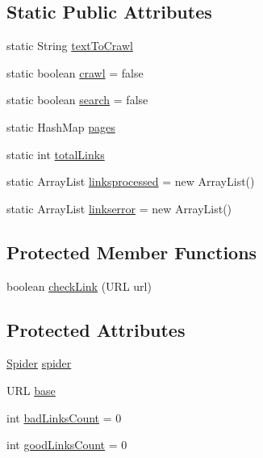 \subsection*{\-Static \-Public \-Attributes}
\begin{DoxyCompactItemize}
\item 
static \-String \hyperlink{classcom_1_1spider_1_1jspiderlibrary2_1_1_communicator_a77d1d4556b66f56aad5fe9e1afda94d6}{text\-To\-Crawl}
\item 
static boolean \hyperlink{classcom_1_1spider_1_1jspiderlibrary2_1_1_communicator_aa0fb097a1e3dd28c5b3595965d0ebcd7}{crawl} = false
\item 
static boolean \hyperlink{classcom_1_1spider_1_1jspiderlibrary2_1_1_communicator_af0e22c130c8e3180b699325c5258bd83}{search} = false
\item 
static \-Hash\-Map \hyperlink{classcom_1_1spider_1_1jspiderlibrary2_1_1_communicator_a0c07a2143b8d612dd3a37f0ea948c458}{pages}
\item 
static int \hyperlink{classcom_1_1spider_1_1jspiderlibrary2_1_1_communicator_af85276b4b0e742776669cd6af974480c}{total\-Links}
\item 
static \-Array\-List \hyperlink{classcom_1_1spider_1_1jspiderlibrary2_1_1_communicator_ae6f31dbdb619cb67252f0c549ea8d81d}{linksprocessed} = new \-Array\-List()
\item 
static \-Array\-List \hyperlink{classcom_1_1spider_1_1jspiderlibrary2_1_1_communicator_ad9dc6cc7afc6f0203c1b5c723cd3cb06}{linkserror} = new \-Array\-List()
\end{DoxyCompactItemize}
\subsection*{\-Protected \-Member \-Functions}
\begin{DoxyCompactItemize}
\item 
boolean \hyperlink{classcom_1_1spider_1_1jspiderlibrary2_1_1_communicator_aa952bce8373401854579773a53fee26a}{check\-Link} (\-U\-R\-L url)
\end{DoxyCompactItemize}
\subsection*{\-Protected \-Attributes}
\begin{DoxyCompactItemize}
\item 
\hyperlink{classcom_1_1spider_1_1jspiderlibrary2_1_1_spider}{\-Spider} \hyperlink{classcom_1_1spider_1_1jspiderlibrary2_1_1_communicator_ad0dd6511cd30b7ad8edfd359a21c6cc3}{spider}
\item 
\-U\-R\-L \hyperlink{classcom_1_1spider_1_1jspiderlibrary2_1_1_communicator_ad0101fe504108054c599ff671b035ae7}{base}
\item 
int \hyperlink{classcom_1_1spider_1_1jspiderlibrary2_1_1_communicator_af90a1a8ad937a05d9b6058e669d28ca1}{bad\-Links\-Count} = 0
\item 
int \hyperlink{classcom_1_1spider_1_1jspiderlibrary2_1_1_communicator_a4d9dc7e33426c4efc3694340240bb568}{good\-Links\-Count} = 0
\end{DoxyCompactItemize}


